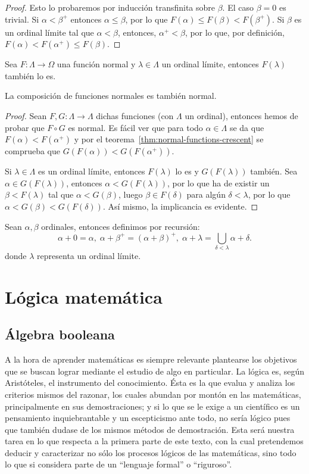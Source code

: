 \documentclass[11pt,a4paper]{book}
\begin{document}
\begin{proof}
	Esto lo probaremos por inducción transfinita sobre $\beta$. El caso $\beta=0$ es trivial. Si $\alpha<\beta^+$ entonces $\alpha\leq\beta$, por lo que $F(\alpha)\leq F(\beta)<F(\beta^+)$. Si $\beta$ es un ordinal límite tal que $\alpha<\beta$, entonces, $\alpha^+<\beta$, por lo que, por definición, $F(\alpha)<F(\alpha^+)\leq F(\beta)$.
\end{proof}
\begin{lema}
	Sea $F:\Lambda\rightarrow\Omega$ una función normal y $\lambda\in\Lambda$ un ordinal límite, entonces $F(\lambda)$ también lo es.
\end{lema}
\begin{thm}
	La composición de funciones normales es también normal.
\end{thm}
\begin{proof}
	Sean $F,G:\Lambda\rightarrow\Lambda$ dichas funciones (con $\Lambda$ un ordinal), entonces hemos de probar que $F\circ G$ es normal. Es fácil ver que para todo $\alpha\in\Lambda$ se da que $F(\alpha)<F(\alpha^+)$ y por el teorema~\ref{thm:normal-functions-crescent} se comprueba que $G(F(\alpha))<G(F(\alpha^+))$.

	Si $\lambda\in\Lambda$ es un ordinal límite, entonces $F(\lambda)$ lo es y $G(F(\lambda))$ también. Sea $\alpha\in G(F(\lambda))$, entonces $\alpha<G(F(\lambda))$, por lo que ha de existir un $\beta<F(\lambda)$ tal que $\alpha<G(\beta)$, luego $\beta\in F(\delta)$ para algún $\delta<\lambda$, por lo que $\alpha<G(\beta)<G(F(\delta))$. Así mismo, la implicancia es evidente.
\end{proof}
\begin{mydef}
	Sean $\alpha,\beta$ ordinales, entonces definimos por recursión:
	$$\alpha+0=\alpha,\;\alpha+\beta^+=(\alpha+\beta)^+,\;\alpha+\lambda=\bigcup_{\delta\lt\lambda}\alpha+\delta.$$
	donde $\lambda$ representa un ordinal límite.
\end{mydef}

\part{Lógica matemática}
\chapter{Álgebra booleana}
A la hora de aprender matemáticas es siempre relevante plantearse los objetivos que se buscan lograr mediante el estudio de algo en particular. La lógica es, según Aristóteles, el instrumento del conocimiento. Ésta es la que evalua y analiza los criterios mismos del razonar, los cuales abundan por montón en las matemáticas, principalmente en sus demostraciones; y si lo que se le exige a un científico es un pensamiento inquiebrantable y un escepticismo ante todo, no sería lógico pues que también dudase de los mismos métodos de demostración. Esta será nuestra tarea en lo que respecta a la primera parte de este texto, con la cual pretendemos deducir y caracterizar no sólo los procesos lógicos de las matemáticas, sino todo lo que si considera parte de un ``lenguaje formal'' o ``riguroso''.
\end{document}
